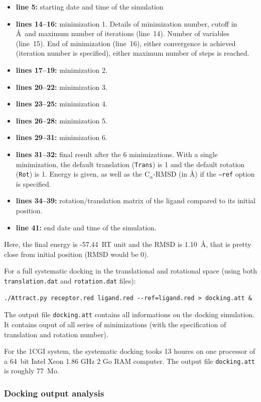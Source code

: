 \documentclass[12pt,a4paper]{article}
\begin{document}
\begin{itemize}
\item{\bf line 5:} starting date and time of the simulation
\item{\bf lines 14--16:} minimization 1. Details of minimization number, cutoff in \AA\ and maximum number of iterations (line~14). 
Number of variables (line~15). End of minimization (line~16), either convergence is achieved (iteration number is specified), either maximum number of steps is reached.
\item{\bf lines 17--19:} minimization 2.
\item{\bf lines 20--22:} minimization 3.
\item{\bf lines 23--25:} minimization 4.
\item{\bf lines 26--28:} minimization 5.
\item{\bf lines 29--31:} minimization 6.
\item{\bf lines 31--32:} final result after the 6 minimizations. With a single minimization, 
the default translation ({\tt Trans}) is 1 and the default rotation ({\tt Rot}) is 1. 
Energy is given, as well as the C$_{\alpha}$-RMSD (in \AA) if the {\tt --ref} option is specified.
\item{\bf lines 34--39:} rotation/translation matrix of the ligand compared to its initial position.
\item{\bf line 41:} end date and time of the simulation.
\end{itemize}

Here, the final energy is -57.44~RT unit and the RMSD is 1.10~\AA, that is pretty close from initial position (RMSD would be 0).

For a full systematic docking in the translational and rotational space (using both {\tt translation.dat}
and {\tt rotation.dat} files):
\begin{verbatim}
./Attract.py receptor.red ligand.red --ref=ligand.red > docking.att &
\end{verbatim}

The output file {\tt docking.att} contains all informations on the docking simulation. 
It contains ouput of all series of minimizations (with the specification of translation and rotation number).

For the 1CGI system, the systematic docking tooks 13 houres on one processor of a 64~bit Intel Xeon 1.86 GHz 2 Go RAM computer.
The output file {\tt docking.att} is roughly 77~Mo.

\subsubsection{Docking output analysis}
\end{document}
